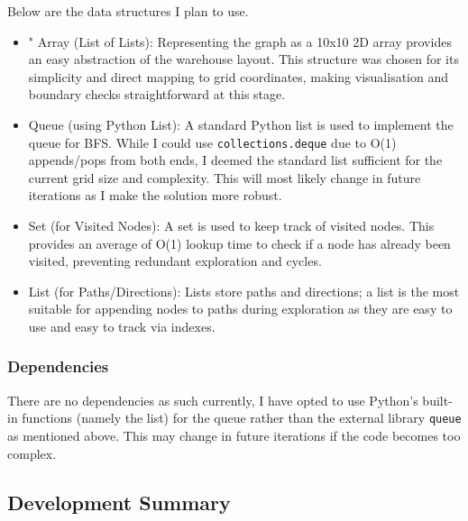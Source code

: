 Below are the data structures I plan to use.
\begin{itemize}
    \item " Array (List of Lists): Representing the graph as a 10x10 2D array provides an easy abstraction of the warehouse layout. This structure was chosen for its simplicity and direct mapping to grid coordinates, making visualisation and boundary checks straightforward at this stage.
    \item Queue (using Python List): A standard Python list is used to implement the queue for BFS. While I could use \verb|collections.deque| due to O(1) appends/pops from both ends, I deemed the standard list sufficient for the current grid size and complexity. This will most likely change in future iterations as I make the solution more robust.
    \item Set (for Visited Nodes): A set is used to keep track of visited nodes. This provides an average of O(1) lookup time to check if a node has already been visited, preventing redundant exploration and cycles.
    \item List (for Paths/Directions): Lists store paths and directions; a list is the most suitable for appending nodes to paths during exploration as they are easy to use and easy to track via indexes.

\end{itemize}

\subsubsection{Dependencies}
There are no dependencies as such currently, I have opted to use Python's built-in functions (namely the list) for the queue rather than the external library \verb|queue| as mentioned above. This may change in future iterations if the code becomes too complex.

\newpage

\subsection{Development Summary}

